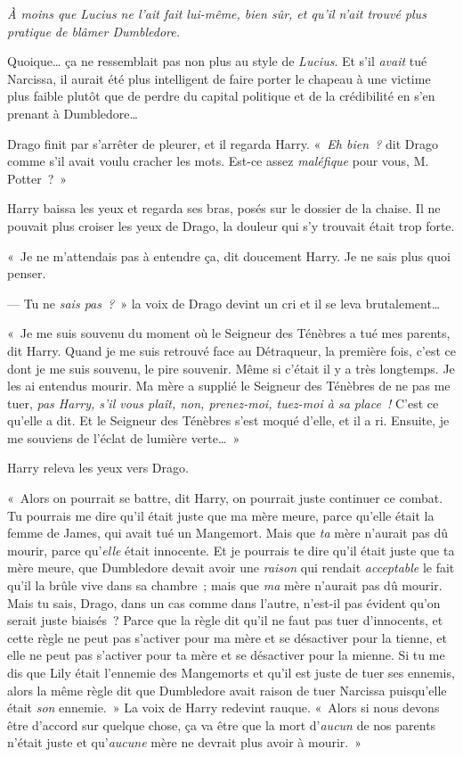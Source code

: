 \emph{À moins que Lucius ne l'ait fait lui-même, bien sûr, et qu'il n'ait trouvé plus pratique de blâmer Dumbledore.}

Quoique… ça ne ressemblait pas non plus au style de \emph{Lucius}. Et s'il \emph{avait} tué Narcissa, il aurait été plus intelligent de faire porter le chapeau à une victime plus faible plutôt que de perdre du capital politique et de la crédibilité en s'en prenant à Dumbledore…

Drago finit par s'arrêter de pleurer, et il regarda Harry. «~\emph{Eh bien~?} dit Drago comme s'il avait voulu cracher les mots. Est-ce assez \emph{maléfique} pour vous, M. Potter~?~»

Harry baissa les yeux et regarda ses bras, posés sur le dossier de la chaise. Il ne pouvait plus croiser les yeux de Drago, la douleur qui s'y trouvait était trop forte.

«~Je ne m'attendais pas à entendre ça, dit doucement Harry. Je ne sais plus quoi penser.

--- Tu ne \emph{sais pas~?}~» la voix de Drago devint un cri et il se leva brutalement…

«~Je me suis souvenu du moment où le Seigneur des Ténèbres a tué mes parents, dit Harry. Quand je me suis retrouvé face au Détraqueur, la première fois, c'est ce dont je me suis souvenu, le pire souvenir. Même si c'était il y a très longtemps. Je les ai entendus mourir. Ma mère a supplié le Seigneur des Ténèbres de ne pas me tuer, \emph{pas Harry, s'il vous plaît, non, prenez-moi, tuez-moi à sa place~!} C'est ce qu'elle a dit. Et le Seigneur des Ténèbres s'est moqué d'elle, et il a ri. Ensuite, je me souviens de l'éclat de lumière verte…~»

Harry releva les yeux vers Drago.

«~Alors on pourrait se battre, dit Harry, on pourrait juste continuer ce combat. Tu pourrais me dire qu'il était juste que ma mère meure, parce qu'elle était la femme de James, qui avait tué un Mangemort. Mais que \emph{ta} mère n'aurait pas dû mourir, parce qu'\emph{elle} était innocente. Et je pourrais te dire qu'il était juste que ta mère meure, que Dumbledore devait avoir une \emph{raison} qui rendait \emph{acceptable} le fait qu'il la brûle vive dans sa chambre~; mais que \emph{ma} mère n'aurait pas dû mourir. Mais tu sais, Drago, dans un cas comme dans l'autre, n'est-il pas évident qu'on serait juste biaisés~? Parce que la règle dit qu'il ne faut pas tuer d'innocents, et cette règle ne peut pas s'activer pour ma mère et se désactiver pour la tienne, et elle ne peut pas s'activer pour ta mère et se désactiver pour la mienne. Si tu me dis que Lily était l'ennemie des Mangemorts et qu'il est juste de tuer ses ennemis, alors la même règle dit que Dumbledore avait raison de tuer Narcissa puisqu'elle était \emph{son} ennemie.~» La voix de Harry redevint rauque. «~Alors si nous devons être d'accord sur quelque chose, ça va être que la mort d'\emph{aucun} de nos parents n'était juste et qu'\emph{aucune} mère ne devrait plus avoir à mourir.~»

